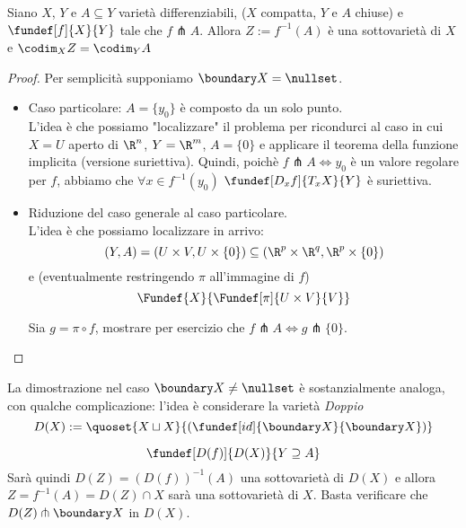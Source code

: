 

\begin{teo}
Siano $X$, $Y$ e $A\subseteq Y$ varietà differenziabili, ($X$ compatta, $Y$ e $A$ chiuse) e $\fundef[f]{X}{Y}$  tale che $f\pitchfork A$. Allora $Z := f^{-1}(A)$ è una sottovarietà di $X$ e $\codim_X{Z} = \codim_Y{A}$
\end{teo}

\begin{proof}
Per semplicità supponiamo $\boundary X = \nullset$.\\
\begin{itemize}
\item Caso particolare: $A = \{ y_0 \}$ è composto da un solo punto. \\
L'idea è che possiamo "localizzare" il problema per ricondurci al caso in cui $X = U$ aperto di $\R^n$, $Y = \R^m$, $A = \{ 0 \}$ e applicare il teorema della funzione implicita (versione suriettiva). Quindi, poichè $f\pitchfork A \iff y_0$ è un valore regolare per $f$, abbiamo che $\forall x \in f^{-1}(y_0)$  $\fundef[D_xf]{T_xX}{Y}$ è suriettiva.
\item Riduzione del caso generale al caso particolare.\\
L'idea è che possiamo localizzare in arrivo: $$(Y,A) = (U \times V, U \times \{ 0 \}) \subseteq (\R^p \times \R^q, \R^p \times \{ 0 \})$$
e (eventualmente restringendo $\pi$ all'immagine di $f$)
$$ \Fundef{X}{\Fundef[\pi]{U \times V}{V}}$$
\begin{center}
  
\end{center}
Sia $g = \pi \circ f$, mostrare per esercizio che $f \pitchfork A \iff g \pitchfork \{ 0 \}$.
\end{itemize}
\end{proof}

La dimostrazione nel caso $\boundary X \neq \nullset$ è sostanzialmente analoga, con qualche complicazione: l'idea è considerare la varietà \emph{Doppio}
$$D(X) := \quoset{X \sqcup X}{(\fundef[id]{\boundary X}{\boundary X})}$$
\begin{center}
  
\end{center}
$$\fundef[D(f)]{D(X)}{Y \supseteq A}$$
Sarà quindi $D(Z) = (D(f))^{-1}(A)$ una sottovarietà di $D(X)$ e allora $Z = f^{-1}(A) = D(Z) \cap X$ sarà una sottovarietà di $X$. Basta verificare che $D(Z) \pitchfork \boundary X$ in $D(X)$.\\

